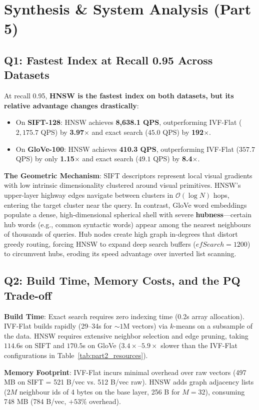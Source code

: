 \documentclass[10pt,twocolumn,a4paper]{article}
\begin{document}
\section{Synthesis \& System Analysis (Part 5)}

\subsection{Q1: Fastest Index at Recall 0.95 Across Datasets}
At recall 0.95, \textbf{HNSW is the fastest index on both datasets, but its relative advantage changes drastically}:
\begin{itemize}
    \item On \textbf{SIFT-128}: HNSW achieves \textbf{8,638.1 QPS}, outperforming IVF-Flat ($2,175.7$ QPS) by \textbf{3.97$\times$} and exact search ($45.0$ QPS) by \textbf{192$\times$}.
    \item On \textbf{GloVe-100}: HNSW achieves \textbf{410.3 QPS}, outperforming IVF-Flat ($357.7$ QPS) by only \textbf{1.15$\times$} and exact search ($49.1$ QPS) by \textbf{8.4$\times$}.
\end{itemize}
\textbf{The Geometric Mechanism}: SIFT descriptors represent local visual gradients with low intrinsic dimensionality clustered around visual primitives. HNSW's upper-layer highway edges navigate between clusters in $\mathcal{O}(\log N)$ hops, entering the target cluster near the query. In contrast, GloVe word embeddings populate a dense, high-dimensional spherical shell with severe \textbf{hubness}---certain hub words (e.g., common syntactic words) appear among the nearest neighbours of thousands of queries. Hub nodes create high graph in-degrees that distort greedy routing, forcing HNSW to expand deep search buffers ($efSearch = 1200$) to circumvent hubs, eroding its speed advantage over inverted list scanning.

\subsection{Q2: Build Time, Memory Costs, and the PQ Trade-off}
\textbf{Build Time}: Exact search requires zero indexing time (0.2s array allocation). IVF-Flat builds rapidly (29--34s for $\sim 1\text{M}$ vectors) via $k$-means on a subsample of the data. HNSW requires extensive neighbor selection and edge pruning, taking $114.6$s on SIFT and $170.5$s on GloVe ($3.4\times$--$5.9\times$ slower than the IVF-Flat configurations in Table~\ref{tab:part2_resources}).

\textbf{Memory Footprint}: IVF-Flat incurs minimal overhead over raw vectors (497 MB on SIFT = 521 B/vec vs. 512 B/vec raw). HNSW adds graph adjacency lists ($2M$ neighbour ids of 4 bytes on the base layer, 256 B for $M=32$), consuming 748 MB (784 B/vec, $+53\%$ overhead). 
\end{document}
